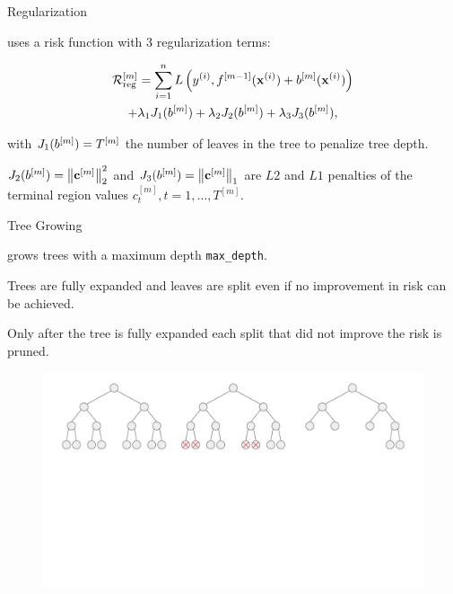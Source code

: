 \begin{frame}{Regularization}

   uses a risk function with 3 regularization terms:

  \begin{multline*}
    \mathcal{R}_{\text{reg}}^{[m]} = \sum_{i=1}^{n} L\left(y^{(i)}, f^{[m-1]}(\mathbf{x}^{(i)}) + b^{[m]}(\mathbf{x}^{(i)})\right)\\
    + \lambda_1 J_1(b^{[m]}) + \lambda_2 J_2(b^{[m]}) + \lambda_3 J_3(b^{[m]}),
  \end{multline*}

  \lz

  with $J_1(b^{[m]}) = T^{[m]}$ the number of leaves in the tree to penalize tree depth.

  \lz

  $J_2(b^{[m]}) = \left\|\mathbf{c}^{[m]}\right\|^2_2$ and $J_3(b^{[m]}) = \left\|\mathbf{c}^{[m]}\right\|_1$ are $L2$ and $L1$ penalties of the terminal region values $c_t^{[m]}, t=1,\dots,T^{[m]}$.

\end{frame}


\begin{vbframe}{Tree Growing}

   grows trees with a maximum depth \texttt{max\_depth}.

  \lz

  Trees are fully expanded and leaves are split even if no improvement in risk can be achieved.

  \lz

  Only after the tree is fully expanded each split that did not improve the risk is pruned.

  \begin{figure}
    \includegraphics[trim=0 260 230 20, clip, width=\textwidth,page=2]{figure_man/trees_balance.pdf}
  \end{figure}


\end{vbframe}


